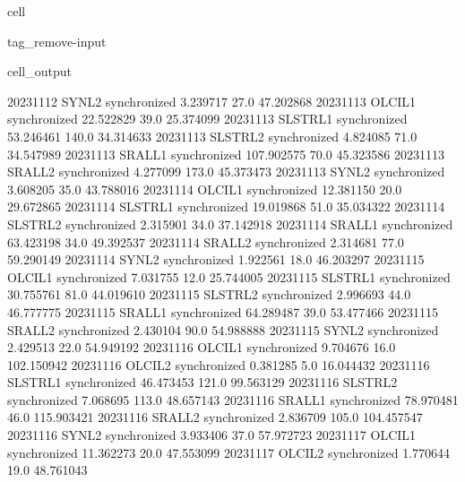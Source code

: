 \documentclass[letterpaper,10pt,english]{jupyterBook}
\begin{document}
\begin{sphinxuseclass}{cell}
\begin{sphinxuseclass}{tag_remove-input}
\begin{sphinxVerbatimOutput}
\begin{sphinxuseclass}{cell_output}
\begin{sphinxVerbatim}[commandchars=\\\{\}]
2023\PYGZhy{}11\PYGZhy{}12       SYN\PYGZus{}L2  synchronized    3.239717    27.0   47.202868
2023\PYGZhy{}11\PYGZhy{}13      OLCI\PYGZus{}L1  synchronized   22.522829    39.0   25.374099
2023\PYGZhy{}11\PYGZhy{}13     SLSTR\PYGZus{}L1  synchronized   53.246461   140.0   34.314633
2023\PYGZhy{}11\PYGZhy{}13     SLSTR\PYGZus{}L2  synchronized    4.824085    71.0   34.547989
2023\PYGZhy{}11\PYGZhy{}13      SRAL\PYGZus{}L1  synchronized  107.902575    70.0   45.323586
2023\PYGZhy{}11\PYGZhy{}13      SRAL\PYGZus{}L2  synchronized    4.277099   173.0   45.373473
2023\PYGZhy{}11\PYGZhy{}13       SYN\PYGZus{}L2  synchronized    3.608205    35.0   43.788016
2023\PYGZhy{}11\PYGZhy{}14      OLCI\PYGZus{}L1  synchronized   12.381150    20.0   29.672865
2023\PYGZhy{}11\PYGZhy{}14     SLSTR\PYGZus{}L1  synchronized   19.019868    51.0   35.034322
2023\PYGZhy{}11\PYGZhy{}14     SLSTR\PYGZus{}L2  synchronized    2.315901    34.0   37.142918
2023\PYGZhy{}11\PYGZhy{}14      SRAL\PYGZus{}L1  synchronized   63.423198    34.0   49.392537
2023\PYGZhy{}11\PYGZhy{}14      SRAL\PYGZus{}L2  synchronized    2.314681    77.0   59.290149
2023\PYGZhy{}11\PYGZhy{}14       SYN\PYGZus{}L2  synchronized    1.922561    18.0   46.203297
2023\PYGZhy{}11\PYGZhy{}15      OLCI\PYGZus{}L1  synchronized    7.031755    12.0   25.744005
2023\PYGZhy{}11\PYGZhy{}15     SLSTR\PYGZus{}L1  synchronized   30.755761    81.0   44.019610
2023\PYGZhy{}11\PYGZhy{}15     SLSTR\PYGZus{}L2  synchronized    2.996693    44.0   46.777775
2023\PYGZhy{}11\PYGZhy{}15      SRAL\PYGZus{}L1  synchronized   64.289487    39.0   53.477466
2023\PYGZhy{}11\PYGZhy{}15      SRAL\PYGZus{}L2  synchronized    2.430104    90.0   54.988888
2023\PYGZhy{}11\PYGZhy{}15       SYN\PYGZus{}L2  synchronized    2.429513    22.0   54.949192
2023\PYGZhy{}11\PYGZhy{}16      OLCI\PYGZus{}L1  synchronized    9.704676    16.0  102.150942
2023\PYGZhy{}11\PYGZhy{}16      OLCI\PYGZus{}L2  synchronized    0.381285     5.0   16.044432
2023\PYGZhy{}11\PYGZhy{}16     SLSTR\PYGZus{}L1  synchronized   46.473453   121.0   99.563129
2023\PYGZhy{}11\PYGZhy{}16     SLSTR\PYGZus{}L2  synchronized    7.068695   113.0   48.657143
2023\PYGZhy{}11\PYGZhy{}16      SRAL\PYGZus{}L1  synchronized   78.970481    46.0  115.903421
2023\PYGZhy{}11\PYGZhy{}16      SRAL\PYGZus{}L2  synchronized    2.836709   105.0  104.457547
2023\PYGZhy{}11\PYGZhy{}16       SYN\PYGZus{}L2  synchronized    3.933406    37.0   57.972723
2023\PYGZhy{}11\PYGZhy{}17      OLCI\PYGZus{}L1  synchronized   11.362273    20.0   47.553099
2023\PYGZhy{}11\PYGZhy{}17      OLCI\PYGZus{}L2  synchronized    1.770644    19.0   48.761043

\end{sphinxVerbatim}
\end{sphinxuseclass}
\end{sphinxVerbatimOutput}
\end{sphinxuseclass}
\end{sphinxuseclass}
\end{document}
